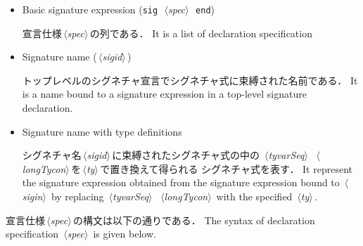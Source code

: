\documentclass{jbook}
\newcommand{\txt}[2]{#2}
\newcommand{\nonterm}[1]{\mbox{$\,\langle$}{\it #1}\mbox{$\rangle\,$}}
\newcommand{\term}[1]{\mbox{{\tt #1}}}
\begin{document}
\begin{itemize}
\item \txt{基本シグネチャ式}{Basic signature expression} (\term{sig}\ \nonterm{spec}\ \term{end})

\ifjp%
	宣言仕様\nonterm{spec}の列である．
\else%
	It is a list of declaration specification
\fi%
\item \txt{シグネチャ名}{Signature name} (\nonterm{sigid})

\ifjp%
	トップレベルのシグネチャ宣言でシグネチャ式に束縛された名前である．
\else%
	It is a name bound to a signature expression in a top-level
signature declaration.
\fi%

\item \txt{型定義付きのシグネチャ名}{Signature name with type definitions}

\ifjp%
	シグネチャ名\nonterm{sigid}に束縛されたシグネチャ式の中の
\nonterm{tyvarSeq}\ \nonterm{longTycon}を\nonterm{ty}で置き換えて得られる
シグネチャ式を表す．
\else%
	It represent the signature expression obtained
from the signature expression bound to \nonterm{sigin}
by replacing \nonterm{tyvarSeq}\ \nonterm{longTycon} with 
the specified \nonterm{ty}.
\fi%
\end{itemize}

\ifjp%
	宣言仕様\nonterm{spec}の構文は以下の通りである．
\else%
	The syntax of declaration specification \nonterm{spec} is given below.
\fi%
\end{document}
